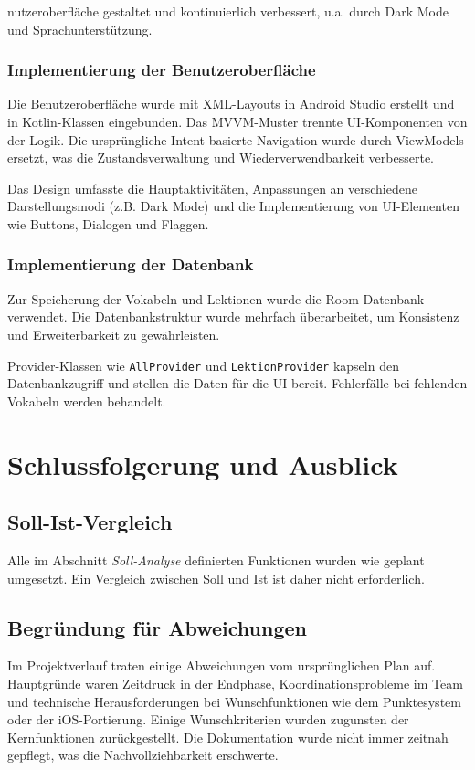 \documentclass[12pt,a4paper]{article}
\begin{document}
nutzeroberfläche gestaltet und kontinuierlich verbessert, u.a. durch Dark Mode und Sprachunterstützung.

\subsubsection{Implementierung der Benutzeroberfläche}
Die Benutzeroberfläche wurde mit XML-Layouts in Android Studio erstellt und in Kotlin-Klassen eingebunden. Das MVVM-Muster trennte UI-Komponenten von der Logik. Die ursprüngliche Intent-basierte Navigation wurde durch ViewModels ersetzt, was die Zustandsverwaltung und Wiederverwendbarkeit verbesserte.

Das Design umfasste die Hauptaktivitäten, Anpassungen an verschiedene Darstellungsmodi (z.B. Dark Mode) und die Implementierung von UI-Elementen wie Buttons, Dialogen und Flaggen.

\subsubsection{Implementierung der Datenbank}
Zur Speicherung der Vokabeln und Lektionen wurde die Room-Datenbank verwendet. Die Datenbankstruktur wurde mehrfach überarbeitet, um Konsistenz und Erweiterbarkeit zu gewährleisten.

Provider-Klassen wie \texttt{AllProvider} und \texttt{LektionProvider} kapseln den Datenbankzugriff und stellen die Daten für die UI bereit. Fehlerfälle bei fehlenden Vokabeln werden behandelt.

\section{Schlussfolgerung und Ausblick}

\subsection{Soll-Ist-Vergleich}
Alle im Abschnitt \textit{Soll-Analyse} definierten Funktionen wurden wie geplant umgesetzt. Ein Vergleich zwischen Soll und Ist ist daher nicht erforderlich.

\subsection{Begründung für Abweichungen}
Im Projektverlauf traten einige Abweichungen vom ursprünglichen Plan auf. Hauptgründe waren Zeitdruck in der Endphase, Koordinationsprobleme im Team und technische Herausforderungen bei Wunschfunktionen wie dem Punktesystem oder der iOS-Portierung. Einige Wunschkriterien wurden zugunsten der Kernfunktionen zurückgestellt. Die Dokumentation wurde nicht immer zeitnah gepflegt, was die Nachvollziehbarkeit erschwerte.
\end{document}
